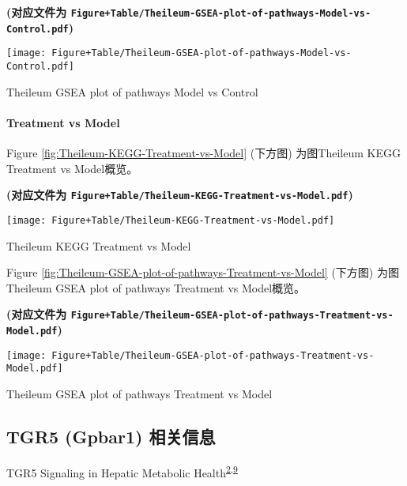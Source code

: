 \documentclass[
]{article}
\begin{document}
\textbf{(对应文件为 \texttt{Figure+Table/Theileum-GSEA-plot-of-pathways-Model-vs-Control.pdf})}

\def\@captype{figure}
\begin{center}
\texttt{[image: Figure+Table/Theileum-GSEA-plot-of-pathways-Model-vs-Control.pdf]}
\caption{Theileum GSEA plot of pathways Model vs Control}\label{fig:Theileum-GSEA-plot-of-pathways-Model-vs-Control}
\end{center}

\hypertarget{treatment-vs-model-1}{%
\paragraph{Treatment vs Model}\label{treatment-vs-model-1}}

Figure \ref{fig:Theileum-KEGG-Treatment-vs-Model} (下方图) 为图Theileum KEGG Treatment vs Model概览。

\textbf{(对应文件为 \texttt{Figure+Table/Theileum-KEGG-Treatment-vs-Model.pdf})}

\def\@captype{figure}
\begin{center}
\texttt{[image: Figure+Table/Theileum-KEGG-Treatment-vs-Model.pdf]}
\caption{Theileum KEGG Treatment vs Model}\label{fig:Theileum-KEGG-Treatment-vs-Model}
\end{center}

Figure \ref{fig:Theileum-GSEA-plot-of-pathways-Treatment-vs-Model} (下方图) 为图Theileum GSEA plot of pathways Treatment vs Model概览。

\textbf{(对应文件为 \texttt{Figure+Table/Theileum-GSEA-plot-of-pathways-Treatment-vs-Model.pdf})}

\def\@captype{figure}
\begin{center}
\texttt{[image: Figure+Table/Theileum-GSEA-plot-of-pathways-Treatment-vs-Model.pdf]}
\caption{Theileum GSEA plot of pathways Treatment vs Model}\label{fig:Theileum-GSEA-plot-of-pathways-Treatment-vs-Model}
\end{center}

\hypertarget{about-tgr}{%
\subsection{TGR5 (Gpbar1) 相关信息}\label{about-tgr}}

TGR5 Signaling in Hepatic Metabolic Health\textsuperscript{\protect\hyperlink{ref-Tgr5SignalingHolter2020}{2},\protect\hyperlink{ref-BileAcidActivKeitel2019}{9}}
\end{document}
